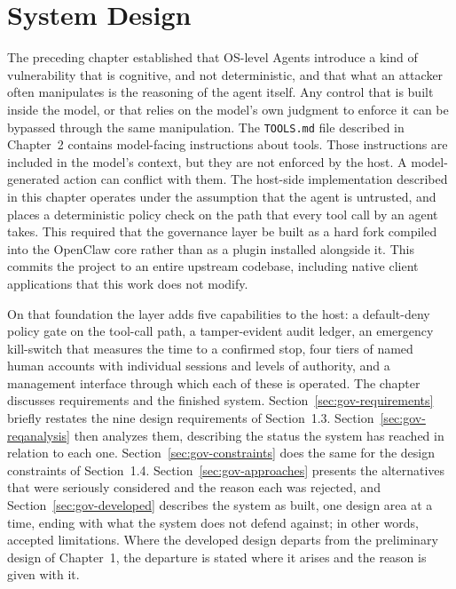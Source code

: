 \chapter{System Design}
\label{ch:design}


The preceding chapter established that OS-level Agents introduce a
kind of vulnerability that is cognitive, and not deterministic, and that what
an attacker often manipulates is the reasoning of the agent itself. Any control that is
built inside the model, or that relies on the model's own judgment to enforce
{\color{red}it can be bypassed through the same manipulation.}
{\color{red}The \texttt{TOOLS.md} file described in Chapter~2 contains
model-facing instructions about tools. Those instructions are included in the
model's context, but they are not enforced by the host. A model-generated
action can conflict with them.}
{\color{red}The host-side implementation described in this chapter operates under the}
assumption that the agent is untrusted, and places a deterministic policy check
on the path that every tool call by an agent takes. This required that the
governance layer be built as a hard fork compiled into the OpenClaw core rather
than as a plugin installed alongside it. This commits the project to an entire upstream codebase, including native client
applications that this work does not modify.

On that foundation the layer adds five capabilities to the host: a default-deny
policy gate on the tool-call path, a tamper-evident audit ledger, an emergency kill-switch that measures the time to a confirmed stop, four tiers of named human accounts with individual sessions and levels of authority, and a management interface through which each of these is operated.
The chapter discusses requirements and the finished system.
Section~\ref{sec:gov-requirements} briefly restates the nine design requirements of
Section~1.3.
Section~\ref{sec:gov-reqanalysis} then analyzes them, describing the status the system has reached in relation to each one.
Section~\ref{sec:gov-constraints} does the same for the design constraints of
Section~1.4. Section~\ref{sec:gov-approaches} presents
the alternatives that were seriously considered and the reason each was
rejected, and Section~\ref{sec:gov-developed} describes the system as built, one
design area at a time, ending with what the system does not defend against; in other words, accepted limitations.
Where the developed design departs from the preliminary design of Chapter~1, the
departure is stated where it arises and the reason is given with it.

